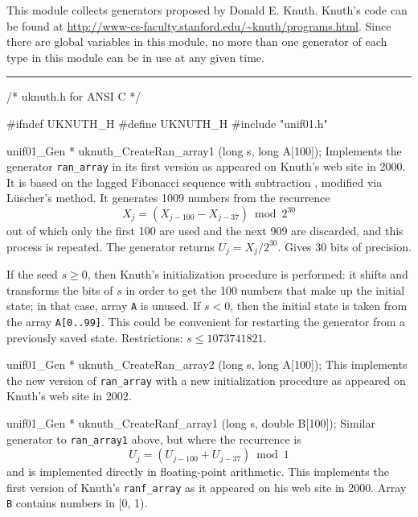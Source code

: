 
This module collects generators proposed by Donald E. Knuth. 
Knuth's code can be found at
\url{http://www-cs-faculty.stanford.edu/~knuth/programs.html}.
Since there are global variables in this module, no more than
one generator of each type  in this module can be in use at any given
time. 


\bigskip
\hrule
\code
\hide
/* uknuth.h for ANSI C */

#ifndef UKNUTH_H
#define UKNUTH_H
\endhide
#include "unif01.h"


unif01_Gen * uknuth_CreateRan_array1 (long s, long A[100]);
\endcode
  \tab  Implements the generator {\tt ran\_array} in its first version as
  appeared on Knuth's web site in 2000. It is
  based on the lagged Fibonacci sequence with
  subtraction \cite{rKNU98a}, modified via L\"uscher's method.
  It generates 1009 numbers from the recurrence
  $$
   X_j = (X_{j-100} - X_{j-37}) \bmod 2^{30}
  $$
  out of which only the first 100 are used and the
  next 909 are discarded, and this process is repeated.
  The generator returns $U_j = X_j/2^{30}$. 
  Gives 30 bits of precision.

  If the seed $s \ge 0$, then Knuth's initialization procedure
  is performed: it shifts and transforms the bits of $s$  in order to get
  the 100 numbers that make up the initial state; in that case, 
  array {\tt A} is unused.
  If  $s < 0$, then the initial state is taken from the array
  {\tt A[0..99]}.  This could be convenient for restarting the
  generator from a previously saved state.
  Restrictions: $s \le 1073741821$.
 \endtab
\code


unif01_Gen * uknuth_CreateRan_array2 (long s, long A[100]);
\endcode
  \tab 
   This implements the new version of {\tt ran\_array} with a new
  initialization procedure as appeared on Knuth's web site in 2002. 
 \endtab
\code


unif01_Gen * uknuth_CreateRanf_array1 (long s, double B[100]);
\endcode
  \tab Similar generator to {\tt ran\_array1} above, but 
   where the recurrence is 
   $$
    U_j = (U_{j-100} + U_{j-37}) \bmod 1
   $$
   and is  implemented directly in floating-point arithmetic.
   This implements the first version of Knuth's 
    {\tt ranf\_array} as it
%
   appeared on his web site in 2000. Array {\tt B} contains
  numbers in [0, 1).
  \endtab
\code


